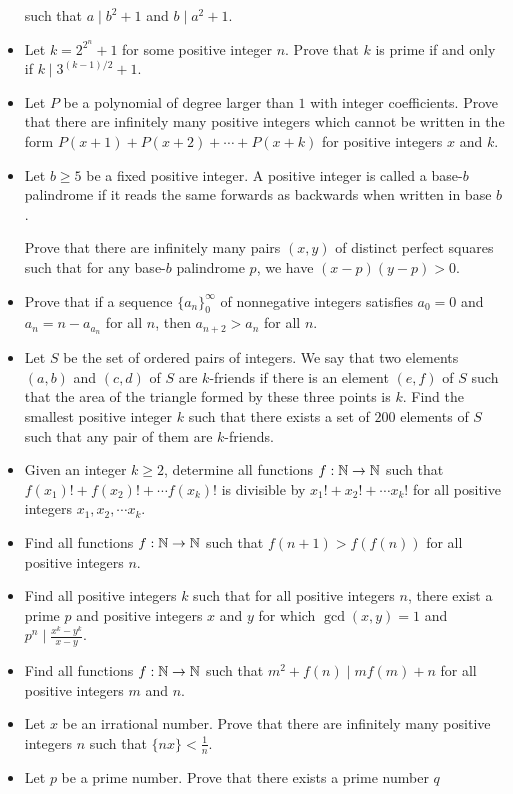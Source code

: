 \begin{itemize}
    such that $a\mid b^2+1$ and $b\mid a^2+1$.
  \item Let $k=2^{2^n}+1$ for some positive integer $n$. Prove that $k$ is prime
    if and only if $k\mid 3^{(k-1)/2}+1$.
  \item Let $P$ be a polynomial of degree larger than $1$ with integer
    coefficients. Prove that there are infinitely many positive integers which cannot be
    written in the form $P(x+1)+P(x+2)+\cdots+P(x+k)$ for positive integers $x$
    and $k$.
  \item Let $b\ge 5$ be a fixed positive integer. A positive integer is called a
    base-$b$ palindrome if it reads the same forwards as backwards when written
    in base $b$. 
    
    Prove that there are infinitely many pairs $(x,y)$ of distinct
    perfect squares such that for any base-$b$ palindrome $p$, we have $(x-p)(y-p)>0$.
  \item Prove that if a sequence $\{a_n\}_0^\infty$ of nonnegative integers satisfies
    $a_0=0$ and $a_n=n-a_{a_n}$ for all $n$, then $a_{n+2}>a_n$ for all $n$.
    \item Let $S$ be the set of ordered pairs of integers. We say that two
      elements $(a,b)$ and $(c,d)$ of $S$ are $k$-friends if there is an element
      $(e,f)$ of $S$ such that the area of the triangle formed by these three
      points is $k$.
      Find the smallest positive integer $k$ such that there exists a set of
      $200$ elements of $S$ such that any pair of them are $k$-friends.
  \item Given an integer $k\geq 2$, determine all functions $f:\mathbb{N}\to\mathbb{N}$
    such that $f(x_1)!+f(x_2)!+\cdots f(x_k)!$
    is divisible by $x_1!+x_2!+\cdots x_k!$ for all positive integers
    $x_1,x_2,\cdots x_k$.
  \item Find all functions $f:\mathbb{N}\to\mathbb{N}$ such that $f(n+1)>f(f(n))$ for all
    positive integers $n$.
  \item Find all positive integers $k$ such that for all positive integers $n$,
    there exist a prime $p$ and positive integers $x$ and $y$ for which
    $\gcd(x,y)=1$ and $p^n\mid \frac{x^k-y^k}{x-y}$.
  \item Find all functions $f:\mathbb{N}\to\mathbb{N}$ such that $m^2+f(n)\mid
    mf(m)+n$ for all positive integers $m$ and $n$.
  \item Let $x$ be an irrational number. Prove that there are infinitely many
    positive integers $n$ such that $\{nx\}<\frac 1n$.
  \item Let $p$ be a prime number. Prove that there exists a prime number $q$

\end{itemize}
